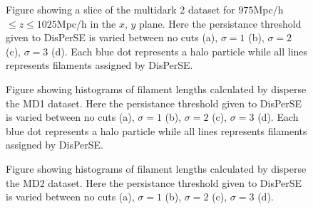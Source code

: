 \begin{figure}[H]
    \hspace{2em}%
    \hspace{2em}%
    \caption{Figure showing a slice of the multidark 2 dataset for $975$Mpc/h $\leq z\leq1025$Mpc/h in the $x$, $y$ plane. Here the persistance threshold given to DisPerSE is varied between no cuts (a), $\sigma=1$ (b), $\sigma=2$ (c), $\sigma=3$ (d). Each blue dot represents a halo particle while all lines represents filaments assigned by DisPerSE.}
    \label{fig:scatterMD2}
\end{figure}

\begin{figure}[H]
    \hspace{1em}%
    \hspace{1em}%
    \caption{Figure showing histograms of filament lengths calculated by disperse the MD1 dataset. Here the persistance threshold given to DisPerSE is varied between no cuts (a), $\sigma=1$ (b), $\sigma=2$ (c), $\sigma=3$ (d). Each blue dot represents a halo particle while all lines represents filaments assigned by DisPerSE.}
    \label{fig:histMD1}
\end{figure}

\begin{figure}[H]
    \hspace{2em}%
    \hspace{2em}%
    \caption{Figure showing histograms of filament lengths calculated by disperse the MD2 dataset. Here the persistance threshold given to DisPerSE is varied between no cuts (a), $\sigma=1$ (b), $\sigma=2$ (c), $\sigma=3$ (d).}
    \label{fig:histMD2}
\end{figure}
